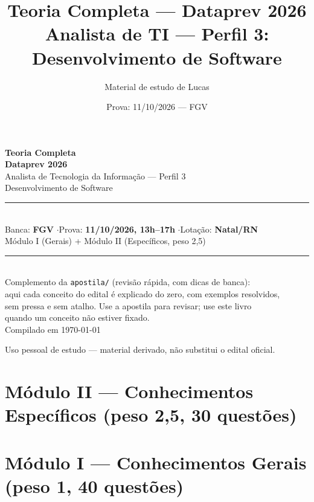 \documentclass[11pt,oneside]{book}
\title{Teoria Completa --- Dataprev 2026\\\Large Analista de TI --- Perfil 3: Desenvolvimento de Software}
\author{Material de estudo de Lucas}
\date{Prova: 11/10/2026 --- FGV}
\begin{document}
\begin{titlepage}
\centering
\vspace*{2cm}
{\Huge\bfseries\color{dpazul} Teoria Completa}\\[6pt]
{\Large\bfseries\color{dpazul} Dataprev 2026}\\[4pt]
{\large Analista de Tecnologia da Informação --- Perfil 3}\\
{\large Desenvolvimento de Software}\\[2cm]

\rule{0.6\textwidth}{0.6pt}\\[1cm]

{\large Banca: \textbf{FGV} \quad$\cdot$\quad Prova: \textbf{11/10/2026, 13h--17h} \quad$\cdot$\quad Lotação: \textbf{Natal/RN}}\\[0.5cm]
{\large Módulo I (Gerais) + Módulo II (Específicos, peso 2,5)}\\[2cm]

\rule{0.6\textwidth}{0.6pt}\\[1cm]

{\large Complemento da \texttt{apostila/} (revisão rápida, com dicas de banca):\\
aqui cada conceito do edital é explicado do zero, com exemplos resolvidos,\\
sem pressa e sem atalho. Use a apostila para revisar; use este livro\\
quando um conceito não estiver fixado.}\\[2cm]

{\normalsize Compilado em \today}

\vfill
{\small Uso pessoal de estudo --- material derivado, não substitui o edital oficial.}
\end{titlepage}

\tableofcontents
\clearpage
{}
\setcounter{chapter}{2}

\part{Módulo II --- Conhecimentos Específicos (peso 2,5, 30 questões)}













\part{Módulo I --- Conhecimentos Gerais (peso 1, 40 questões)}





\end{document}
